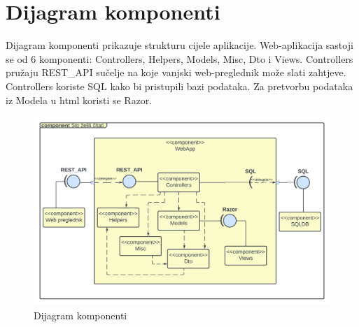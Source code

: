 		\section{Dijagram komponenti}
		
			\raggedright{Dijagram komponenti prikazuje strukturu cijele aplikacije. Web-aplikacija sastoji se od 6 komponenti: Controllers, Helpers, Models, Misc, Dto i Views. Controllers pružaju REST\_API sučelje na koje vanjski web-preglednik može slati zahtjeve. Controllers koriste SQL kako bi pristupili bazi podataka. Za pretvorbu podataka iz Modela u html koristi se Razor.}\\
			
			\begin{figure}[h]
				\centering
				\includegraphics[width = \textwidth]{slike/dijagram_komp.PNG}
				\caption{Dijagram komponenti}
				\label{fig:enter-label}
			\end{figure}
			\eject
			